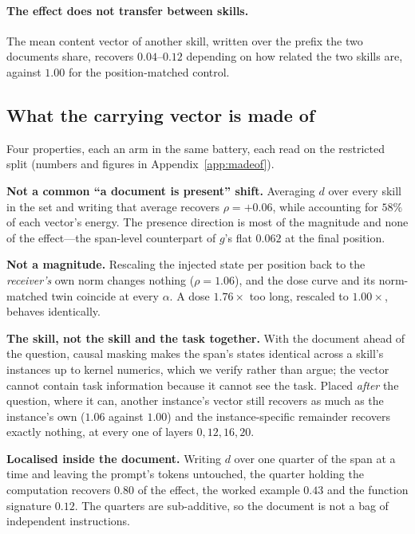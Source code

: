 \documentclass{article}
\newcommand{\dvec}{\ensuremath{d}}
\newcommand{\gvec}{\ensuremath{g}}
\begin{document}
\paragraph{The effect does not transfer between skills.}
The mean content vector of another skill, written over the prefix the two
documents share, recovers $0.04$--$0.12$ depending on how related the two
skills are, against $1.00$ for the position-matched control.

\subsection{What the carrying vector is made of}
\label{sec:whose:docklast}

Four properties, each an arm in the same battery, each read on the restricted
split (numbers and figures in Appendix~\ref{app:madeof}).

\textbf{Not a common ``a document is present'' shift.} Averaging $\dvec$ over
every skill in the set and writing that average recovers $\rho = +0.06$, while
accounting for $58\%$ of each vector's energy. The presence direction is most of
the magnitude and none of the effect---the span-level counterpart of $\gvec$'s
flat $0.062$ at the final position.

\textbf{Not a magnitude.} Rescaling the injected state per position back to the
\emph{receiver's} own norm changes nothing ($\rho = 1.06$), and the dose curve
and its norm-matched twin coincide at every $\alpha$. A dose $1.76\times$ too
long, rescaled to $1.00\times$, behaves identically.

\textbf{The skill, not the skill and the task together.} With the document ahead
of the question, causal masking makes the span's states identical across a
skill's instances up to kernel numerics, which we verify rather than argue; the vector cannot contain
task information because it cannot see the task. Placed \emph{after} the
question, where it can, another instance's vector still recovers as much as the
instance's own ($1.06$ against $1.00$) and the instance-specific remainder
recovers exactly nothing, at every one of layers $0, 12, 16, 20$.

\textbf{Localised inside the document.} Writing $\dvec$ over one quarter of the
span at a time and leaving the prompt's tokens untouched, the quarter holding
the computation recovers $0.80$ of the effect, the worked example $0.43$ and the
function signature $0.12$. The quarters are sub-additive, so the document is not
a bag of independent instructions.
\end{document}
